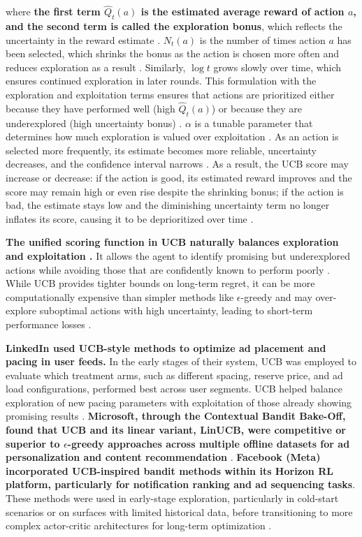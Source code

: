 \documentclass[final]{anthology-ch}         %
\begin{document}
where\textbf{ the first term $\hat{Q}_t(a)$ is the estimated average reward of action $a$, and the second term is called the exploration bonus}, which reflects the uncertainty in the reward estimate \cite{auer2002finite, bubeck2012regret}. $N_t(a)$ is the number of times action $a$ has been selected, which shrinks the bonus as the action is chosen more often and reduces exploration as a result \cite{auer2002finite, bubeck2012regret}. Similarly, $\log t$ grows slowly over time, which ensures continued exploration in later rounds. This formulation with the exploration and exploitation terms ensures that actions are prioritized either because they have performed well (high $\hat{Q}_t(a)$) or because they are underexplored (high uncertainty bonus) \cite{auer2002finite, bubeck2012regret}. $\alpha$ is a tunable parameter that determines how much exploration is valued over exploitation \cite{auer2002finite, bubeck2012regret, Sutton1998}. As an action is selected more frequently, its estimate becomes more reliable, uncertainty decreases, and the confidence interval narrows \cite{auer2002finite, bubeck2012regret}.  As a result, the UCB score may increase or decrease: if the action is good, its estimated reward improves and the score may remain high or even rise despite the shrinking bonus; if the action is bad, the estimate stays low and the diminishing uncertainty term no longer inflates its score, causing it to be deprioritized over time \cite{auer2002finite, bubeck2012regret}. 

\textbf{The unified scoring function in UCB naturally balances exploration and exploitation \cite{auer2002finite, bubeck2012regret}.} It allows the agent to identify promising but underexplored actions while avoiding those that are confidently known to perform poorly \cite{auer2002finite}. While UCB provides tighter bounds on long-term regret, it can be more computationally expensive than simpler methods like $\epsilon$-greedy and may over-explore suboptimal actions with high uncertainty, leading to short-term performance losses \cite{bubeck2012regret, dulac2019challenges, Sutton1998}.

\textbf{LinkedIn used UCB-style methods to optimize ad placement and pacing in user feeds.} In the early stages of their system, UCB was employed to evaluate which treatment arms, such as different spacing, reserve price, and ad load configurations, performed best across user segments. UCB helped balance exploration of new pacing parameters with exploitation of those already showing promising results \cite{yan2020ads}. \textbf{Microsoft, through the Contextual Bandit Bake-Off, found that UCB and its linear variant, LinUCB, were competitive or superior to $\epsilon$-greedy approaches across multiple offline datasets for ad personalization and content recommendation} \cite{bietti2021contextual}.\textbf{ Facebook (Meta) }\textbf{incorporated UCB-inspired bandit methods within its Horizon RL platform, particularly for notification ranking and ad sequencing tasks}. These methods were used in early-stage exploration, particularly in cold-start scenarios or on surfaces with limited historical data, before transitioning to more complex actor-critic architectures for long-term optimization \cite{gauci2018horizon}.
\end{document}
